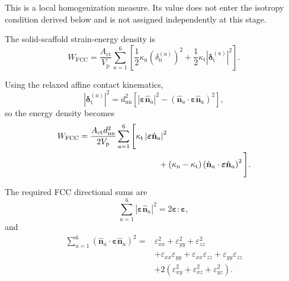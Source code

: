 This is a local homogenization measure. Its value does not enter the isotropy condition derived below and is not assigned independently at this stage.

The solid-scaffold strain-energy density is
\begin{equation}
    W_{\mathrm{FCC}} = \frac{A_{\mathrm{ct}}}{V_{\mathrm{p}}} \sum_{a=1}^{6} \left[ \frac{1}{2} \kappa_{\mathrm{n}} \left( \delta_{\mathrm{n}}^{(a)} \right)^2 + \frac{1}{2} \kappa_{\mathrm{t}} \left| \boldsymbol{\delta}_{\mathrm{t}}^{(a)} \right|^2 \right].
\end{equation}

Using the relaxed affine contact kinematics,
\begin{equation}
    \left| \boldsymbol{\delta}_{\mathrm{t}}^{(a)} \right|^2 = d_{\mathrm{nn}}^2 \left[ \left| \boldsymbol{\varepsilon} \hat{\mathbf{n}}_a \right|^2 - \left( \hat{\mathbf{n}}_a \cdot \boldsymbol{\varepsilon} \hat{\mathbf{n}}_a \right)^2 \right],
\end{equation}
so the energy density becomes
\begin{equation}
\begin{aligned}
    W_{\mathrm{FCC}} ={}& \frac{ A_{\mathrm{ct}}d_{\mathrm{nn}}^2 }{ 2V_{\mathrm{p}} } \sum_{a=1}^{6} \Bigg[ \kappa_{\mathrm{t}} \left| \boldsymbol{\varepsilon} \hat{\mathbf{n}}_a \right|^2 \\
    &\hspace{29mm} + \left( \kappa_{\mathrm{n}} - \kappa_{\mathrm{t}} \right) \left( \hat{\mathbf{n}}_a \cdot \boldsymbol{\varepsilon} \hat{\mathbf{n}}_a \right)^2 \Bigg].
\end{aligned}
\end{equation}

The required FCC directional sums are
\begin{equation}
    \boxed{ \sum_{a=1}^{6} \left| \boldsymbol{\varepsilon} \hat{\mathbf{n}}_a \right|^2 = 2 \boldsymbol{\varepsilon} : \boldsymbol{\varepsilon}, }
\end{equation}
and
\begin{equation}
\begin{aligned}
    \sum_{a=1}^{6} \left( \hat{\mathbf{n}}_a \cdot \boldsymbol{\varepsilon} \hat{\mathbf{n}}_a \right)^2 ={}& \varepsilon_{xx}^2 + \varepsilon_{yy}^2 + \varepsilon_{zz}^2 \\
    &+ \varepsilon_{xx}\varepsilon_{yy} + \varepsilon_{xx}\varepsilon_{zz} + \varepsilon_{yy}\varepsilon_{zz} \\
    &+ 2 \left( \varepsilon_{xy}^2 + \varepsilon_{xz}^2 + \varepsilon_{yz}^2 \right).
\end{aligned}
\end{equation}

